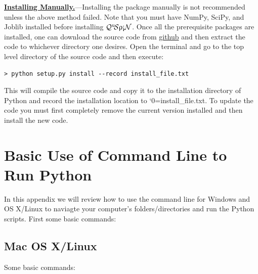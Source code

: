 \documentclass{SciPost}
\newcommand\0{\scalebox{-1}[1]{0}}
\let\svttfamily\ttfamily
\renewcommand\ttfamily{\svttfamily\catcode`0=\active }
\renewcommand\texttt{\bgroup\ttfamily\texttthelp}
\def\texttthelp#1{#1\egroup}
\newcommand{\qspin}{$\mathcal{Q}^{\mathrm{u}}\!\mathcal{S}\uprho\mathrm{\text{\textexclamdown}}\mathcal{N}$}
\begin{document}
\begin{appendix}
\underline{\bf Installing Manually.}---Installing the package manually is not recommended unless the above method failed. Note that you must have NumPy, SciPy, and Joblib installed before installing \qspin. Once all the prerequisite packages are installed, one can download the source code from \href{https://github.com/weinbe58/qspin/tree/master}{github} and then extract the code to whichever directory one desires. Open the terminal and go to the top level directory of the source code and then execute:  
\begin{lstlisting}[numbers=none,keywordstyle=\ttfamily]
> python setup.py install --record install_file.txt
\end{lstlisting}
This will compile the source code and copy it to the installation directory of Python and record the installation location to \texttt{install\_file.txt}. To update the code you must first completely remove the current version installed and then install the new code. 


\section{Basic Use of Command Line to Run Python}
\label{app:cmd_line}

In this appendix we will review how to use the command line for Windows and OS X/Linux to naviagte your computer's folders/directories and run the Python scripts. First some basic commands:

\subsection{Mac OS X/Linux}
Some basic commands:


\end{appendix}
\end{document}
